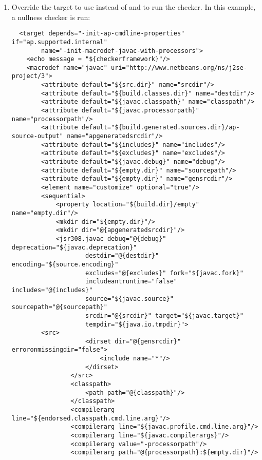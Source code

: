 {\begin{enumerate}
\item
Override the  target to
use  instead of  and to run the checker.
In this example, a nullness checker is run:

\begin{smaller}
\begin{Verbatim}
  <target depends="-init-ap-cmdline-properties" if="ap.supported.internal"
        name="-init-macrodef-javac-with-processors">
    <echo message = "${checkerframework}"/>
    <macrodef name="javac" uri="http://www.netbeans.org/ns/j2se-project/3">
        <attribute default="${src.dir}" name="srcdir"/>
        <attribute default="${build.classes.dir}" name="destdir"/>
        <attribute default="${javac.classpath}" name="classpath"/>
        <attribute default="${javac.processorpath}" name="processorpath"/>
        <attribute default="${build.generated.sources.dir}/ap-source-output" name="apgeneratedsrcdir"/>
        <attribute default="${includes}" name="includes"/>
        <attribute default="${excludes}" name="excludes"/>
        <attribute default="${javac.debug}" name="debug"/>
        <attribute default="${empty.dir}" name="sourcepath"/>
        <attribute default="${empty.dir}" name="gensrcdir"/>
        <element name="customize" optional="true"/>
        <sequential>
            <property location="${build.dir}/empty" name="empty.dir"/>
            <mkdir dir="${empty.dir}"/>
            <mkdir dir="@{apgeneratedsrcdir}"/>
            <jsr308.javac debug="@{debug}" deprecation="${javac.deprecation}"
                    destdir="@{destdir}" encoding="${source.encoding}"
                    excludes="@{excludes}" fork="${javac.fork}"
                    includeantruntime="false" includes="@{includes}"
                    source="${javac.source}" sourcepath="@{sourcepath}"
                    srcdir="@{srcdir}" target="${javac.target}"
                    tempdir="${java.io.tmpdir}">
		<src>
                    <dirset dir="@{gensrcdir}" erroronmissingdir="false">
                        <include name="*"/>
                    </dirset>
                </src>
                <classpath>
                    <path path="@{classpath}"/>
                </classpath>
                <compilerarg line="${endorsed.classpath.cmd.line.arg}"/>
                <compilerarg line="${javac.profile.cmd.line.arg}"/>
                <compilerarg line="${javac.compilerargs}"/>
                <compilerarg value="-processorpath"/>
                <compilerarg path="@{processorpath}:${empty.dir}"/>

\end{Verbatim}
\end{smaller}
\end{enumerate}}
